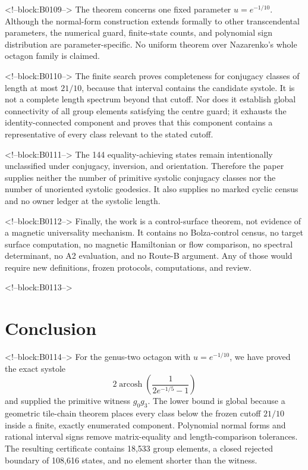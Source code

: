 \documentclass[11pt,a4paper]{article}
\theoremstyle{definition}
\newcommand{\arcosh}{\operatorname{arcosh}}
\begin{document}
<!--block:B0109-->
The theorem concerns one fixed parameter \(u=e^{-1/10}\).  Although the
normal-form construction extends formally to other transcendental
parameters, the numerical guard, finite-state counts, and polynomial sign
distribution are parameter-specific.  No uniform theorem over Nazarenko's
whole octagon family is claimed.

<!--block:B0110-->
The finite search proves completeness for conjugacy classes of length at most
\(21/10\), because that interval contains the candidate systole.  It is not a
complete length spectrum beyond that cutoff.  Nor does it establish global
connectivity of all group elements satisfying the centre guard; it exhausts
the identity-connected component and proves that this component contains a
representative of every class relevant to the stated cutoff.

<!--block:B0111-->
The 144 equality-achieving states remain intentionally unclassified under
conjugacy, inversion, and orientation.  Therefore the paper supplies neither
the number of primitive systolic conjugacy classes nor the number of
unoriented systolic geodesics.  It also supplies no marked cyclic census and
no owner ledger at the systolic length.

<!--block:B0112-->
Finally, the work is a control-surface theorem, not evidence of a magnetic
universality mechanism.  It contains no Bolza-control census, no target
surface computation, no magnetic Hamiltonian or flow comparison, no spectral
determinant, no A2 evaluation, and no Route-B argument.  Any of those would
require new definitions, frozen protocols, computations, and review.

<!--block:B0113-->
\section{Conclusion}

<!--block:B0114-->
For the genus-two octagon with \(u=e^{-1/10}\), we have proved the exact
systole
\[
 2\arcosh\!\left(\frac{1}{2e^{-1/5}-1}\right)
\]
and supplied the primitive witness \(g_0g_3\).  The lower bound is global
because a geometric tile-chain theorem places every class below the frozen
cutoff \(21/10\) inside a finite, exactly enumerated component.  Polynomial
normal forms and rational interval signs remove matrix-equality and
length-comparison tolerances.  The resulting certificate contains 18,533
group elements, a closed rejected boundary of 108,616 states, and no element
shorter than the witness.
\end{document}
